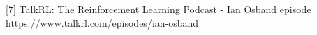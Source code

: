 \documentclass[preview]{standalone}
\begin{document}
\begin{center}
[7] TalkRL: The Reinforcement Learning Podcast - Ian Osband episode\\https://www.talkrl.com/episodes/ian-osband
\end{center}
\end{document}
